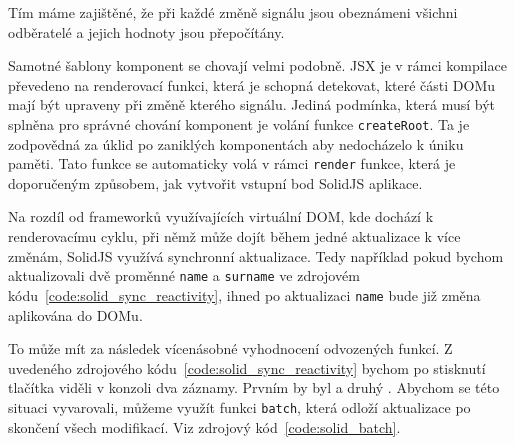 \documentclass[
  master,
  program=ainf,
  tables=false,
  sourcecodes,
  glossaries,
  index
]{kidiplom}
\begin{document}
Tím máme zajištěné, že při každé změně signálu jsou obeznámeni všichni odběratelé a jejich hodnoty jsou
přepočítány.

Samotné šablony komponent se chovají velmi podobně. JSX je v rámci kompilace převedeno na renderovací
funkci, která je schopná detekovat, které části DOMu mají být upraveny při změně kterého signálu.
Jediná podmínka, která musí být splněna pro správné chování komponent je volání funkce {\tt createRoot}. 
Ta je zodpovědná za úklid po zaniklých komponentách aby nedocházelo k úniku paměti. Tato funkce se 
automaticky volá v rámci {\tt render} funkce, která je doporučeným způsobem, jak vytvořit vstupní bod
SolidJS \cite{solidjs} aplikace.

Na rozdíl od frameworků využívajících virtuální DOM, kde dochází k renderovacímu cyklu, při němž 
může dojít během jedné aktualizace k více změnám, SolidJS \cite{solidjs} využívá synchronní aktualizace. Tedy například
pokud bychom aktualizovali dvě proměnné {\tt name} a {\tt surname} ve zdrojovém kódu~\ref{code:solid_sync_reactivity},
ihned po aktualizaci {\tt name} bude již změna aplikována do DOMu.

\begin{absolutelynopagebreak}
\end{absolutelynopagebreak}

To může mít za následek vícenásobné vyhodnocení odvozených funkcí. Z uvedeného zdrojového kódu~\ref{code:solid_sync_reactivity} bychom po
stisknutí tlačítka viděli v konzoli dva záznamy. Prvním by byl  a druhý .
Abychom se této situaci vyvarovali, můžeme využít funkci {\tt batch}, která odloží aktualizace po skončení
všech modifikací. Viz zdrojový kód~\ref{code:solid_batch}.
\end{document}

